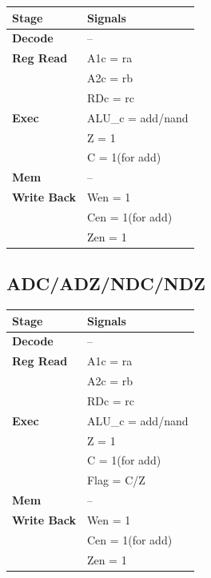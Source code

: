 \documentclass{article}
\begin{document}
\begin{tabular}{|l|l|}
\hline
\textbf{Stage} & \textbf{Signals}\\
\hline
\textbf{Decode} & --\\
\hline
\textbf{Reg Read} & A1c = ra \\
                  & A2c = rb \\
                  & RDc = rc \\ 
\hline
\textbf{Exec} & ALU\_c = add/nand\\
              & Z = 1\\
              & C = 1(for add)\\  
\hline
\textbf{Mem} & --\\
\hline
\textbf{Write Back} & Wen = 1\\
                    & Cen = 1(for add)\\
                    & Zen = 1\\
\hline
\end{tabular}

\subsection*{ADC/ADZ/NDC/NDZ}
\begin{tabular}{|l|l|}
\hline
\textbf{Stage} & \textbf{Signals}\\
\hline
\textbf{Decode} & --\\
\hline
\textbf{Reg Read} & A1c = ra \\
                  & A2c = rb \\
                  & RDc = rc \\ 
\hline
\textbf{Exec} & ALU\_c = add/nand\\
              & Z = 1\\
              & C = 1(for add)\\
              & Flag = C/Z\\
\hline
\textbf{Mem} & --\\
\hline
\textbf{Write Back} & Wen = 1\\
                    & Cen = 1(for add)\\
                    & Zen = 1\\
\hline
\end{tabular}
\end{document}
